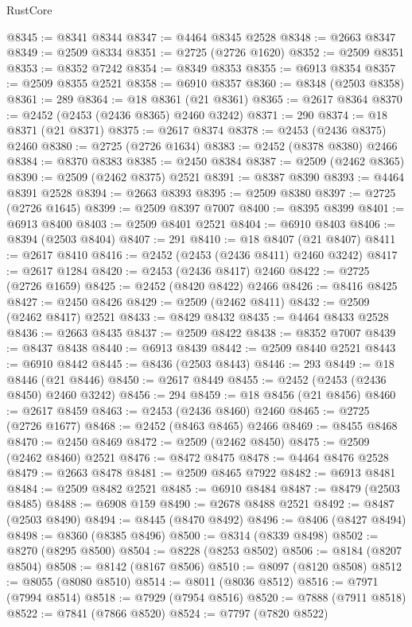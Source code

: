 \begin{lexlean}{RustCore}
\begin{coremodule}
@8345 := @8341 @8344
@8347 := @4464 @8345 @2528
@8348 := @2663 @8347
@8349 := @2509 @8334
@8351 := @2725 (@2726 @1620)
@8352 := @2509 @8351
@8353 := @8352 @7242
@8354 := @8349 @8353
@8355 := @6913 @8354
@8357 := @2509 @8355 @2521
@8358 := @6910 @8357
@8360 := @8348 (@2503 @8358)
@8361 := 289
@8364 := @18 @8361 (@21 @8361)
@8365 := @2617 @8364
@8370 := @2452 (@2453 (@2436 @8365) @2460 @3242)
@8371 := 290
@8374 := @18 @8371 (@21 @8371)
@8375 := @2617 @8374
@8378 := @2453 (@2436 @8375) @2460
@8380 := @2725 (@2726 @1634)
@8383 := @2452 (@8378 @8380) @2466
@8384 := @8370 @8383
@8385 := @2450 @8384
@8387 := @2509 (@2462 @8365)
@8390 := @2509 (@2462 @8375) @2521
@8391 := @8387 @8390
@8393 := @4464 @8391 @2528
@8394 := @2663 @8393
@8395 := @2509 @8380
@8397 := @2725 (@2726 @1645)
@8399 := @2509 @8397 @7007
@8400 := @8395 @8399
@8401 := @6913 @8400
@8403 := @2509 @8401 @2521
@8404 := @6910 @8403
@8406 := @8394 (@2503 @8404)
@8407 := 291
@8410 := @18 @8407 (@21 @8407)
@8411 := @2617 @8410
@8416 := @2452 (@2453 (@2436 @8411) @2460 @3242)
@8417 := @2617 @1284
@8420 := @2453 (@2436 @8417) @2460
@8422 := @2725 (@2726 @1659)
@8425 := @2452 (@8420 @8422) @2466
@8426 := @8416 @8425
@8427 := @2450 @8426
@8429 := @2509 (@2462 @8411)
@8432 := @2509 (@2462 @8417) @2521
@8433 := @8429 @8432
@8435 := @4464 @8433 @2528
@8436 := @2663 @8435
@8437 := @2509 @8422
@8438 := @8352 @7007
@8439 := @8437 @8438
@8440 := @6913 @8439
@8442 := @2509 @8440 @2521
@8443 := @6910 @8442
@8445 := @8436 (@2503 @8443)
@8446 := 293
@8449 := @18 @8446 (@21 @8446)
@8450 := @2617 @8449
@8455 := @2452 (@2453 (@2436 @8450) @2460 @3242)
@8456 := 294
@8459 := @18 @8456 (@21 @8456)
@8460 := @2617 @8459
@8463 := @2453 (@2436 @8460) @2460
@8465 := @2725 (@2726 @1677)
@8468 := @2452 (@8463 @8465) @2466
@8469 := @8455 @8468
@8470 := @2450 @8469
@8472 := @2509 (@2462 @8450)
@8475 := @2509 (@2462 @8460) @2521
@8476 := @8472 @8475
@8478 := @4464 @8476 @2528
@8479 := @2663 @8478
@8481 := @2509 @8465 @7922
@8482 := @6913 @8481
@8484 := @2509 @8482 @2521
@8485 := @6910 @8484
@8487 := @8479 (@2503 @8485)
@8488 := @6908 @159
@8490 := @2678 @8488 @2521
@8492 := @8487 (@2503 @8490)
@8494 := @8445 (@8470 @8492)
@8496 := @8406 (@8427 @8494)
@8498 := @8360 (@8385 @8496)
@8500 := @8314 (@8339 @8498)
@8502 := @8270 (@8295 @8500)
@8504 := @8228 (@8253 @8502)
@8506 := @8184 (@8207 @8504)
@8508 := @8142 (@8167 @8506)
@8510 := @8097 (@8120 @8508)
@8512 := @8055 (@8080 @8510)
@8514 := @8011 (@8036 @8512)
@8516 := @7971 (@7994 @8514)
@8518 := @7929 (@7954 @8516)
@8520 := @7888 (@7911 @8518)
@8522 := @7841 (@7866 @8520)
@8524 := @7797 (@7820 @8522)

\end{coremodule}
\end{lexlean}
